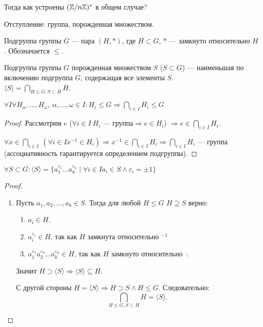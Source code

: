  Тогда как устроены $(\mathbb{Z} / n \mathbb{Z})^*$ в общем случае?

 Отступление: группа, порожденная множеством.
 \begin{definition}
     Подгруппа группы $G$ --- пара  $(H, \ast)$, где  $H \subset G$,  $\ast$ --- замкнуто относительно $H$. Обозначается $\le$.
 \end{definition}
 \begin{definition}
     Подгруппа группы $G$ порожденная множеством  $S$  ($S \subset G$) --- наименьшая по включению подгруппа $G$, содержащая все элементы  $S$.\\
     $\langle S \rangle = \displaystyle \bigcap_{H \le G, S \subset H} H$.\\
 \end{definition}
 \begin{remark}
     $\forall I \forall H_\alpha, \ldots, H_\omega,\ \alpha, \ldots, \omega \in I\!: H_i \le G \Rightarrow \displaystyle \bigcap_{i \in I} H_i \le G$
 \end{remark}
 \begin{proof}
    Рассмотрим $e$ ($\forall i \in I\ H_i\text{ --- группа} \Rightarrow e \in H_i$) $\Rightarrow e \in \bigcap_{i \in I} H_i$.
    
    $\forall x \in \bigcap_{i \in I}\ (\forall i \in I x^{-1} \in H_i) \Rightarrow x^{-1} \in \bigcap_{i \in I} H_i \Rightarrow \bigcap_{i \in I} H_i$ --- группа (ассоциативность гарантируется определением подгруппы).
 \end{proof}
 \begin{theorem}
     $\forall S \subset G\!: \langle S \rangle= \{a_1^{\varepsilon_1} \ldots a_k^{\varepsilon_k} \mid \forall i \in I a_i \in S \land \varepsilon_i = \pm 1\}$
 \end{theorem}
 \begin{proof}
     \slashn
     \begin{enumerate}
         \item Пусть $a_1, a_2, \ldots, a_k \in S$. Тогда для любой $H \le G$ $H \supseteq S$ верно:
              \begin{enumerate}
                  \item $a_i \in H$.
                  \item  $a_i^{\varepsilon_i} \in H$, так как  $H$ замкнута относительно $^{-1}$
                  \item  $a_1^{\varepsilon_1} a_2^{\varepsilon_2} \ldots a_k^{\varepsilon_k} \in H$, так как $H$ замкнуто относительно  $\cdot$.
             \end{enumerate}

             Значит $H \supset \langle S \rangle \Rightarrow \langle S \rangle \subseteq H$.
        
             С другой стороны $H = \langle S \rangle \Rightarrow H \supset S \land H \le G$. Следовательно:  \[
                 \bigcap_{H \le G, S \subset H} H = \langle S \rangle
             .\] 
     \end{enumerate}

 \end{proof}

